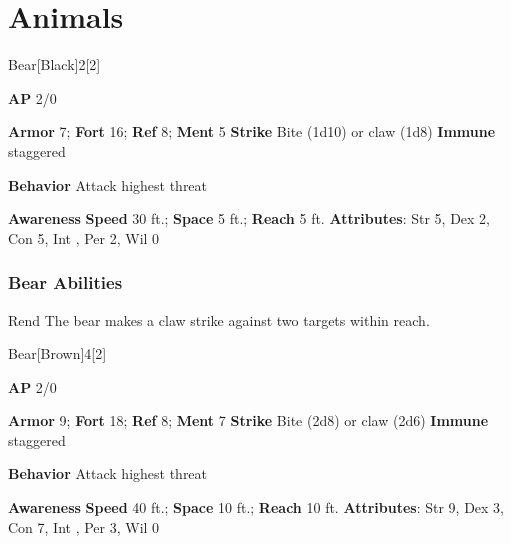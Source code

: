 \section{Animals}
\begin{monsection}{Bear}[Black]{2}[2]
\vspace{-1em}\vspace{-1em}
\begin{spellcontent}
\begin{spelltargetinginfo}
{\textbf{AP} 2/0}

\pari \textbf{Armor} 7;
\textbf{Fort} 16;
\textbf{Ref} 8;
\textbf{Ment} 5
\pari \textbf{Strike} Bite  (1d10) or claw  (1d8)
\pari \textbf{Immune} staggered


\pari \textbf{Behavior} Attack highest threat
\end{spelltargetinginfo}
\end{spellcontent}

\begin{monsterfooter}
\pari \textbf{Awareness} 
\pari \textbf{Speed} 30 ft.;
\textbf{Space} 5 ft.;
\textbf{Reach} 5 ft.
\pari \textbf{Attributes}:
Str 5,
Dex 2,
Con 5,
Int ,
Per 2,
Wil 0
\end{monsterfooter}
\end{monsection}


\subsubsection{Bear Abilities}

\begin{freeability}{Rend}
The bear makes a claw strike against two targets within reach.
\end{freeability}

\begin{monsection}{Bear}[Brown]{4}[2]
\vspace{-1em}\vspace{-1em}
\begin{spellcontent}
\begin{spelltargetinginfo}
{\textbf{AP} 2/0}

\pari \textbf{Armor} 9;
\textbf{Fort} 18;
\textbf{Ref} 8;
\textbf{Ment} 7
\pari \textbf{Strike} Bite  (2d8) or claw  (2d6)
\pari \textbf{Immune} staggered


\pari \textbf{Behavior} Attack highest threat
\end{spelltargetinginfo}
\end{spellcontent}

\begin{monsterfooter}
\pari \textbf{Awareness} 
\pari \textbf{Speed} 40 ft.;
\textbf{Space} 10 ft.;
\textbf{Reach} 10 ft.
\pari \textbf{Attributes}:
Str 9,
Dex 3,
Con 7,
Int ,
Per 3,
Wil 0
\end{monsterfooter}
\end{monsection}


